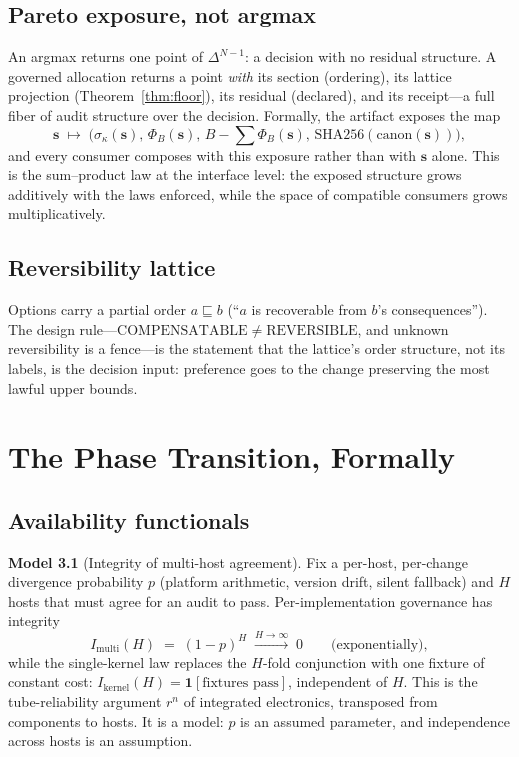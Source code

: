 \documentclass[12pt,oneside]{report}
\theoremstyle{plain}
\theoremstyle{definition}
\newtheorem{modelx}[theorem]{Model}
\theoremstyle{remark}
\newcommand{\simplex}{\Delta}
\newcommand{\shares}{\mathbf{s}}
\begin{document}
\section{Pareto exposure, not argmax}

An argmax returns one point of $\simplex^{N-1}$: a decision with no
residual structure. A governed allocation returns a point \emph{with}
its section (ordering), its lattice projection
(Theorem~\ref{thm:floor}), its residual (declared), and its
receipt---a full fiber of audit structure over the decision.
Formally, the artifact exposes the map
\begin{equation}
\shares \;\longmapsto\; \bigl(\sigma_\kappa(\shares),\,
\Phi_B(\shares),\, B-\textstyle\sum\Phi_B(\shares),\,
\mathrm{SHA256}(\mathrm{canon}(\shares))\bigr),
\end{equation}
and every consumer composes with this exposure rather than with
$\shares$ alone. This is the sum--product law at the interface level:
the exposed structure grows additively with the laws enforced, while
the space of compatible consumers grows multiplicatively.

\section{Reversibility lattice}

Options carry a partial order $a\sqsubseteq b$ (``$a$ is recoverable
from $b$'s consequences''). The design rule---$\mathrm{COMPENSATABLE}
\neq \mathrm{REVERSIBLE}$, and unknown reversibility is a fence---is
the statement that the lattice's order structure, not its labels, is
the decision input: preference goes to the change preserving the most
lawful upper bounds.

\chapter{The Phase Transition, Formally}
\label{ch:phase-formal}

\section{Availability functionals}

\begin{modelx}[Integrity of multi-host agreement]
\label{model:availability}
Fix a per-host, per-change divergence probability $p$ (platform
arithmetic, version drift, silent fallback) and $H$ hosts that must
agree for an audit to pass. Per-implementation governance has integrity
\begin{equation}
I_{\mathrm{multi}}(H) \;=\; (1-p)^H \;\xrightarrow{H\to\infty}\; 0
\qquad\text{(exponentially)},
\end{equation}
while the single-kernel law replaces the $H$-fold conjunction with one
fixture of constant cost: $I_{\mathrm{kernel}}(H) =
\mathbf{1}[\text{fixtures pass}]$, independent of $H$. This is the
tube-reliability argument $r^n$ of integrated electronics, transposed
from components to hosts. It is a model: $p$ is an assumed parameter,
and independence across hosts is an assumption.
\end{modelx}
\end{document}
